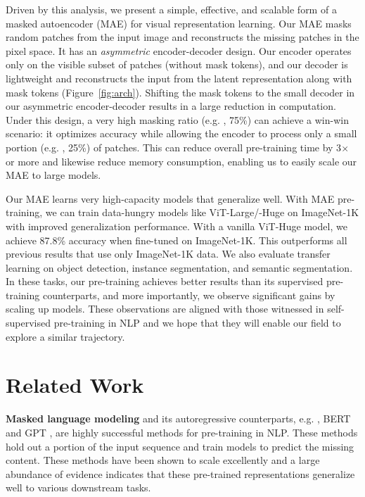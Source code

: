 Driven by this analysis, we present a simple, effective, and scalable form of a masked autoencoder (MAE) for visual representation learning. Our MAE masks random patches from the input image and reconstructs the missing patches in the pixel space. It has an \textit{asymmetric} encoder-decoder design. Our encoder operates only on the visible subset of patches (without mask tokens), and our decoder is lightweight and reconstructs the input from the latent representation along with mask tokens (Figure~\ref{fig:arch}). Shifting the mask tokens to the small decoder in our asymmetric encoder-decoder results in a large reduction in computation. Under this design, a very high masking ratio (e.g. , 75\%) can achieve a win-win scenario: it optimizes accuracy while allowing the encoder to process only a small portion (e.g. , 25\%) of patches. This can reduce overall pre-training time by 3${\times}$ or more and likewise reduce memory consumption, enabling us to easily scale our MAE to large models.

Our MAE learns very high-capacity models that generalize well. With MAE pre-training, we can train data-hungry models like ViT-Large/-Huge \cite{Dosovitskiy2021} on ImageNet-1K with improved generalization performance. With a vanilla \mbox{ViT-Huge} model, we achieve 87.8\% accuracy when fine-tuned on ImageNet-1K. This outperforms all previous results that use only ImageNet-1K data. We also evaluate transfer learning on object detection, instance segmentation, and semantic segmentation. In these tasks, our pre-training achieves better results than its supervised pre-training counterparts, and more importantly, we observe significant gains by scaling up models. These observations are aligned with those witnessed in self-supervised pre-training in NLP \cite{Devlin2019, Radford2018, Radford2019, Brown2020} and we hope that they will enable our field to explore a similar trajectory.

\section{Related Work}\label{sec:related}

\textbf{Masked language modeling} and its autoregressive counterparts, e.g. , BERT \cite{Devlin2019} and GPT \cite{Radford2018, Radford2019, Brown2020}, are highly successful methods for pre-training in NLP. These methods hold out a portion of the input sequence and train models to predict the missing content. These methods have been shown to scale excellently \cite{Brown2020} and a large abundance of evidence indicates that these pre-trained representations generalize well to various downstream tasks.

